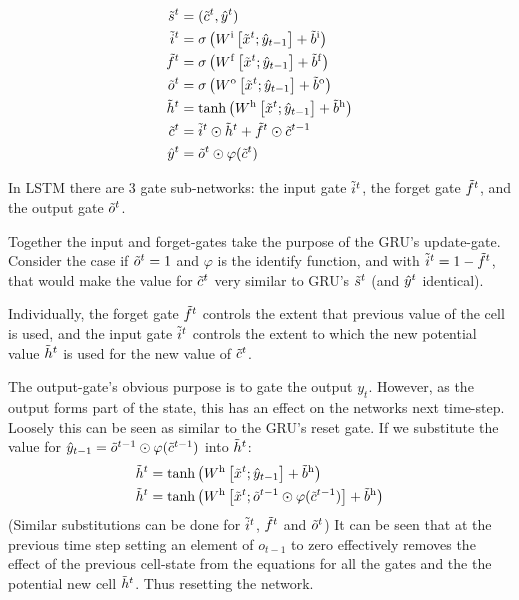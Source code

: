 \documentclass[12pt,parskip]{komatufte}
\begin{document}
\begin{align}
\nv s_t &= (\nv c_t, \n \hat{y}_t)\\
%
\nv i_t &= \sigma \left( \d W_i \left[\nv x_t; \hat{y}_{t-1}\right] + \dv b_i \right) \\
\nv f_t &= \sigma \left( \d W_f\left[\nv x_t; \hat{y}_{t-1}\right] + \dv b_f \right) \\
\nv o_t &= \sigma \left( \d W_o\left[\nv x_t; \hat{y}_{t-1}\right] + \dv b_o \right) \\
%
\nv h_t &= \tanh \left( \d W_h\left[\nv x_t; \hat{y}_{t-1}\right] + \dv b_h \right) \\
\nv c_t &=  \nv i_t\odot \nv h_t + \nv f_t \odot \nv c_{t-1} \\
\n \hat{y}_t &= \nv o_t \odot \varphi(\nv c_t)
\end{align}



In LSTM there are 3 gate sub-networks:
the input gate $\nv i_t$, the forget gate $\nv f_t$, and the output gate $\nv o_t$.

Together the input and forget-gates take the purpose of the GRU's update-gate.
Consider the case if $\nv o_t=1$ and $\varphi$ is the identify function,
and with $\nv i_t=1-\nv f_t$, that would make the value for $\nv c_t$ very similar to GRU's $\nv s_t$ (and $\n \hat{y}_t$ identical).

Individually, the forget gate $\nv f_t$ controls the extent that previous value of the cell is used,
and the input gate $\nv i_t$ controls the extent to which the new potential value $\nv h_t$ is used for the new value of $\nv c_t$.

The output-gate's obvious purpose is to gate the output $y_t$.
However, as the output forms part of the state,
this has an effect on the networks next time-step.
Loosely this can be seen as similar to the GRU's reset gate.
If we substitute the value for $\hat{y}_{t-1} = \nv o_{t-1} \odot \varphi(\nv c_{t-1})$
into $\nv h_t$:
\begin{align}
\nv h_t &= \tanh \left( \d W_h\left[\nv x_t; \hat{y}_{t-1}\right] + \dv b_h \right) \\
\nv h_t &= \tanh \left( \d W_h\left[\nv x_t;  \nv o_{t-1} \odot \varphi(\nv c_{t-1})\right] + \dv b_h \right) 
\end{align}
(Similar substitutions can be done for $\nv i_t$, $\nv f_t$ and $\nv o_t$)
It can be seen that at the previous time step setting an element of $o_{t-1}$ to zero effectively removes the effect of the previous cell-state from the equations for all the gates and the the potential new cell $\nv h_t$.
Thus resetting the network.
\end{document}
